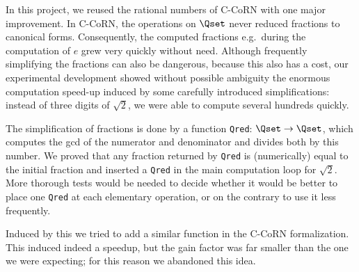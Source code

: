 \documentclass{entcs}
\begin{document}
In this project, we reused the rational numbers of C-CoRN with one major
improvement.  In C-CoRN,
the operations on $\Qset$ never reduced fractions to
canonical forms.  Consequently, the computed fractions e.g.\ during
the computation of $e$ grew very quickly without need.
Although frequently simplifying the fractions can also be dangerous, because
this also has a cost, our experimental development showed without
possible ambiguity the enormous computation speed-up induced by some
carefully introduced
simplifications: instead of three digits of
$\sqrt{2}$, we were able to compute several hundreds quickly.

The simplification of fractions is done by a function \texttt{Qred}:
$\Qset\to\Qset$, which computes the gcd of the numerator
and denominator and divides both by this number.  We
proved that any fraction returned by \texttt{Qred} is (numerically) equal to
the initial fraction and inserted a \texttt{Qred} in the main
computation loop for $\sqrt{2}$.
More thorough tests would be needed to decide whether it would be better
to place one \texttt{Qred} at each elementary operation, or on the contrary
to use it less frequently.

Induced by this we tried to add a similar function in the C-CoRN
formalization.  This induced indeed a speedup, but the gain factor was far
smaller than the one we were expecting; for this reason we abandoned this
idea.
\end{document}
